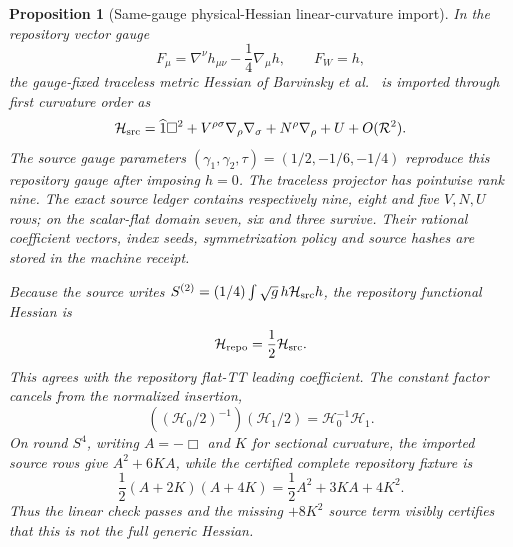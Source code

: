 \documentclass[11pt]{article}
\newtheorem{proposition}[theorem]{Proposition}
\theoremstyle{definition}
\theoremstyle{remark}
\begin{document}
\begin{proposition}[Same-gauge physical-Hessian linear-curvature import]
In the repository vector gauge
\[
 F_\mu=\nabla^\nu h_{\mu\nu}-\frac14\nabla_\mu h,
 \qquad F_W=h,
\]
the gauge-fixed traceless metric Hessian of Barvinsky et
al.~\cite{BarvinskyLocal} is imported through first curvature order as
\[
 \mathcal H_{\rm src}=\widehat 1\Box^2
  +V^{\rho\sigma}\nabla_\rho\nabla_\sigma
  +N^\rho\nabla_\rho+U+O(\mathcal R^2).
\]
The source gauge parameters
$(\gamma_1,\gamma_2,\tau)=(1/2,-1/6,-1/4)$ reproduce this repository gauge
after imposing $h=0$.  The traceless projector has pointwise rank nine.  The
exact source ledger contains respectively nine, eight and five $V,N,U$ rows;
on the scalar-flat domain seven, six and three survive.  Their rational
coefficient vectors, index seeds, symmetrization policy and source hashes are
stored in the machine receipt.

Because the source writes
$S^{(2)}=(1/4)\int\sqrt g\,h\mathcal H_{\rm src}h$, the repository functional
Hessian is
\[
 \mathcal H_{\rm repo}=\frac12\mathcal H_{\rm src}.
\]
This agrees with the repository flat-TT leading coefficient.  The constant
factor cancels from the normalized insertion,
\[
 ((\mathcal H_0/2)^{-1})(\mathcal H_1/2)
   =\mathcal H_0^{-1}\mathcal H_1.
\]
On round $S^4$, writing $A=-\Box$ and $K$ for sectional curvature, the
imported source rows give $A^2+6KA$, while the certified complete repository
fixture is
\[
 \frac12(A+2K)(A+4K)=\frac12A^2+3KA+4K^2.
\]
Thus the linear check passes and the missing $+8K^2$ source term visibly
certifies that this is not the full generic Hessian.


\end{proposition}
\end{document}
